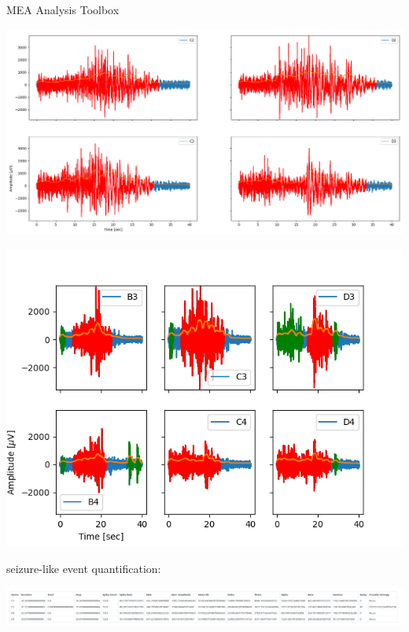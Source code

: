 \documentclass[10pt]{beamer}
\begin{document}
\begin{frame}[allowframebreaks]{MEA Analysis Toolbox}
      \begin{center}
       \includegraphics[keepaspectratio,width=\framewidth]{img/4_bursts_std.png}
      \end{center}
      \framebreak
      \begin{center}
       \includegraphics[keepaspectratio,width=\framewidth]{img/bursts_new.png}
      \end{center}
      \framebreak
      
     seizure-like event quantification: \\ 
     \begin{center}
      \hspace*{-1cm}\includegraphics[keepaspectratio,width=1.18\framewidth]{img/4_event_stats_std.png}
     \end{center}
  \end{frame}
\end{document}
